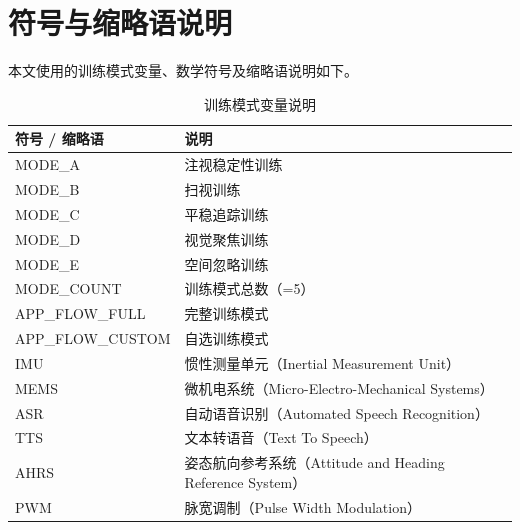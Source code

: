 \chapter*{符号与缩略语说明}

\noindent
本文使用的训练模式变量、数学符号及缩略语说明如下。

\begin{table}[h!]
\centering
\caption{训练模式变量说明}
\label{tab:nomen_modes}
\begin{tabular}{p{4cm} p{10.5cm}}
\toprule[1.5pt]
\textbf{符号 / 缩略语} & \textbf{说明} \\
\hline
MODE\_A & 注视稳定性训练 \\
MODE\_B & 扫视训练 \\
MODE\_C & 平稳追踪训练 \\
MODE\_D & 视觉聚焦训练 \\
MODE\_E & 空间忽略训练 \\
MODE\_COUNT & 训练模式总数（=5） \\
APP\_FLOW\_FULL & 完整训练模式\\
APP\_FLOW\_CUSTOM & 自选训练模式 \\
IMU & 惯性测量单元（Inertial Measurement Unit） \\
MEMS & 微机电系统（Micro-Electro-Mechanical Systems） \\
ASR & 自动语音识别（Automated Speech Recognition） \\
TTS & 文本转语音（Text To Speech） \\
AHRS & 姿态航向参考系统（Attitude and Heading Reference System） \\
PWM & 脉宽调制（Pulse Width Modulation） \\
\bottomrule[1.5pt]
\end{tabular}
\end{table}

